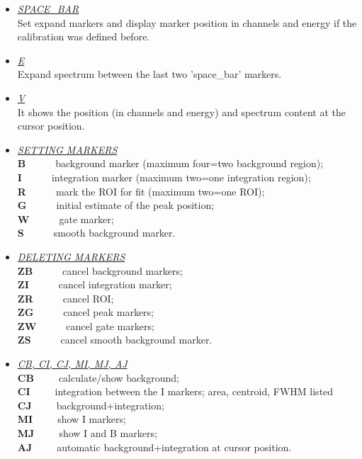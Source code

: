 \begin{itemize}

 \item	{\it\underline{SPACE\_BAR}} \\

	Set expand markers and display marker position in channels and energy
	if the calibration was defined before.

 \item	{\it\underline{E}} \\

	Expand spectrum between the last two 'space\_bar' markers.

 \item	{\it\underline{V}} \\

	It shows the position (in channels and energy) and spectrum content at
	the cursor position.

 \item	{\it\underline{SETTING MARKERS}} \\

	{\bf B}~~~~~~background marker (maximum four=two background region);\\
	{\bf I}~~~~~~integration marker (maximum two=one integration region);\\
	{\bf R}~~~~~~mark the ROI for fit (maximum two=one ROI);\\
	{\bf G}~~~~~~initial estimate of the peak position;\\
	{\bf W}~~~~~~gate marker;\\
	{\bf S}~~~~~~smooth background marker. 

 \item	{\it\underline{DELETING MARKERS}} \\

	{\bf ZB}~~~~~~cancel background markers;\\
	{\bf ZI}~~~~~~cancel integration marker;\\
	{\bf ZR}~~~~~~cancel ROI;\\
	{\bf ZG}~~~~~~cancel peak markers;\\
	{\bf ZW}~~~~~~cancel gate markers;\\
	{\bf ZS}~~~~~~cancel smooth background marker. 

 \item	{\it\underline{CB, CI, CJ, MI, MJ, AJ}} \\

	{\bf CB}~~~~~calculate/show background;\\
	{\bf CI}~~~~~integration between the I markers; area, centroid, FWHM
			listed\\
	{\bf CJ}~~~~~background+integration;\\
	{\bf MI}~~~~~show I markers;\\
	{\bf MJ}~~~~~show I and B markers;\\
	{\bf AJ}~~~~~automatic background+integration at cursor position.


\end{itemize}
